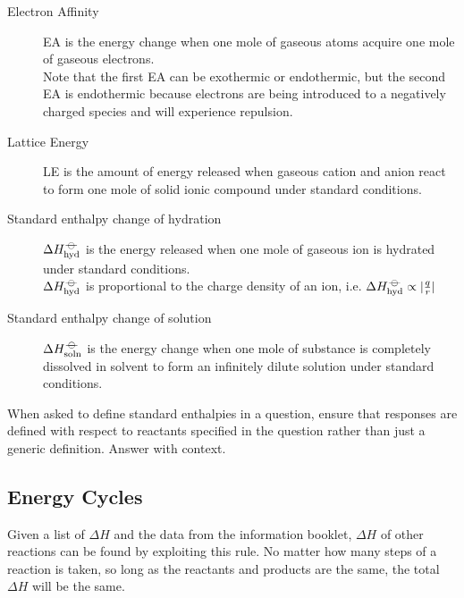 \documentclass[../main]{subfiles}
\begin{document}
\begin{description}
		\item[Electron Affinity] EA is the energy change when one mole of gaseous atoms acquire one mole of gaseous electrons. \\
		Note that the first EA can be exothermic or endothermic, but the second EA is endothermic because electrons are being introduced to a negatively charged species and will experience repulsion.
		
		\item[Lattice Energy] LE is the amount of energy released when gaseous cation and anion  react to form one mole of solid ionic compound under standard conditions.
		
		\item[Standard enthalpy change of hydration] \(\Delta H_\text{hyd}^{-\kern-4pt{\ominus}\kern-4pt-}\) is the energy released when one mole of gaseous ion is hydrated under standard conditions. \\
		\(\Delta H_\text{hyd}^{-\kern-4pt{\ominus}\kern-4pt-}\) is proportional to the charge density of an ion, i.e. \(\Delta H_\text{hyd}^{-\kern-4pt{\ominus}\kern-4pt-} \propto | \frac{q}{r} |\)
		
		\item[Standard enthalpy change of solution] \(\Delta H_\text{soln}^{-\kern-4pt{\ominus}\kern-4pt-}\) is the energy change when one mole of substance is completely dissolved in solvent to form an infinitely dilute solution under standard conditions.

	\end{description}

	When asked to define standard enthalpies in a question, ensure that responses are defined with respect to reactants specified in the question rather than just a generic definition. Answer with context.

	\subsection{Energy Cycles}


	Given a list of \(\Delta H\) and the data from the information booklet, \(\Delta H\) of other reactions can be found by exploiting this rule. No matter how many steps of a reaction is taken, so long as the reactants and products are the same, the total \(\Delta H\) will be the same. \\
\end{document}
